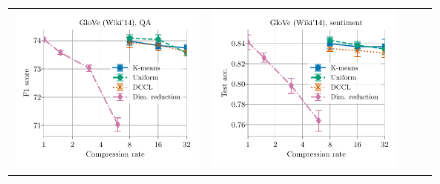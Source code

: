 \begin{figure}
	\centering
	\begin{tabular}{@{\hskip -0.0in}c@{\hskip -0.0in}c@{\hskip -0.0in}c@{\hskip -0.0in}c@{\hskip -0.0in}}
		\includegraphics[width=.245\linewidth]{figures/glove400k_qa_best-f1_vs_compression_linx_det.pdf} &
		\includegraphics[width=.245\linewidth]{figures/glove400k_sentiment_sst_test-acc_vs_compression_linx_det.pdf} &

\end{tabular}
\end{figure}
